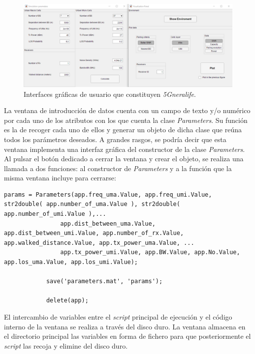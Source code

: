 \begin{figure}[h!]
	\centering
    \includegraphics[width=\linewidth]{imagenes/ventanas.PNG}
	\caption{Interfaces gráficas de usuario que constituyen \textit{5Gneralife}.}
	\label{fig:ventanas_graficas}
\end{figure}

La ventana de introducción de datos cuenta con un campo de texto y/o numérico por cada uno de los atributos con los que cuenta la clase \textit{Parameters}. Su función es la de recoger cada uno de ellos y generar un objeto de dicha clase que reúna todos los parámetros deseados. A grandes rasgos, se podría decir que esta ventana implementa una interfaz gráfica del constructor de la clase \textit{Parameters}. Al pulsar el botón dedicado a cerrar la ventana y crear el objeto, se realiza una llamada a dos funciones: al constructor de \textit{Parameters} y a la función que la misma ventana incluye para cerrarse:

\begin{lstlisting}[style=Matlab-editor, basicstyle=\tiny]
            params = Parameters(app.freq_uma.Value, app.freq_umi.Value, str2double( app.number_of_uma.Value ), str2double( app.number_of_umi.Value ),...
                app.dist_between_uma.Value, app.dist_between_umi.Value, app.number_of_rx.Value, app.walked_distance.Value, app.tx_power_uma.Value, ...
                app.tx_power_umi.Value, app.BW.Value, app.No.Value, app.los_uma.Value, app.los_umi.Value);
            
            save('parameters.mat', 'params');
                
            delete(app);
\end{lstlisting}

El intercambio de variables entre el \textit{script} principal de ejecución y el código interno de la ventana se realiza a través del disco duro. La ventana almacena en el directorio principal las variables en forma de fichero para que posteriormente el \textit{script} las recoja y elimine del disco duro.


